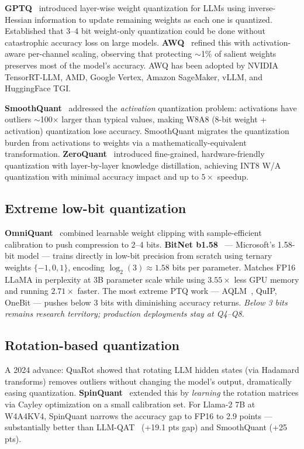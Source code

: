 \documentclass[11pt]{article}
\begin{document}
\textbf{GPTQ}~\cite{frantar2022gptq} introduced layer-wise weight quantization for LLMs using inverse-Hessian information to update remaining weights as each one is quantized. Established that 3--4 bit weight-only quantization could be done without catastrophic accuracy loss on large models. \textbf{AWQ}~\cite{lin2023awq} refined this with activation-aware per-channel scaling, observing that protecting $\sim$1\% of salient weights preserves most of the model's accuracy. AWQ has been adopted by NVIDIA TensorRT-LLM, AMD, Google Vertex, Amazon SageMaker, vLLM, and HuggingFace TGI.

\textbf{SmoothQuant}~\cite{xiao2022smoothquant} addressed the \emph{activation} quantization problem: activations have outliers $\sim$100$\times$ larger than typical values, making W8A8 (8-bit weight + activation) quantization lose accuracy. SmoothQuant migrates the quantization burden from activations to weights via a mathematically-equivalent transformation. \textbf{ZeroQuant}~\cite{yao2022zeroquant} introduced fine-grained, hardware-friendly quantization with layer-by-layer knowledge distillation, achieving INT8 W/A quantization with minimal accuracy impact and up to $5\times$ speedup.

\subsection{Extreme low-bit quantization}

\textbf{OmniQuant}~\cite{shao2023omniquant} combined learnable weight clipping with sample-efficient calibration to push compression to 2--4 bits. \textbf{BitNet b1.58}~\cite{ma2024bitnet} --- Microsoft's 1.58-bit model --- trains directly in low-bit precision from scratch using ternary weights $\{-1, 0, 1\}$, encoding $\log_2(3) \approx 1.58$ bits per parameter. Matches FP16 LLaMA in perplexity at 3B parameter scale while using $3.55\times$ less GPU memory and running $2.71\times$ faster. The most extreme PTQ work --- AQLM~\cite{egiazarian2024aqlm}, QuIP, OneBit --- pushes below 3 bits with diminishing accuracy returns. \emph{Below 3 bits remains research territory; production deployments stay at Q4--Q8.}

\subsection{Rotation-based quantization}

A 2024 advance: QuaRot showed that rotating LLM hidden states (via Hadamard transforms) removes outliers without changing the model's output, dramatically easing quantization. \textbf{SpinQuant}~\cite{liu2024spinquant} extended this by \emph{learning} the rotation matrices via Cayley optimization on a small calibration set. For Llama-2 7B at W4A4KV4, SpinQuant narrows the accuracy gap to FP16 to 2.9 points --- substantially better than LLM-QAT~\cite{liu2023llmqat} (+19.1 pts gap) and SmoothQuant (+25 pts).
\end{document}
